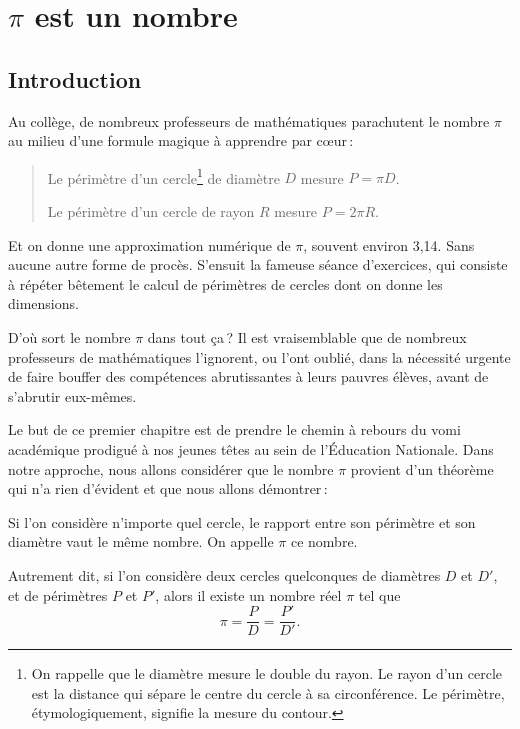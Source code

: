 
\chapter{$\pi$ est un nombre}\label{chap_pinombre}

\section{Introduction}

	Au collège, de nombreux professeurs de mathématiques parachutent le nombre $\pi$ au milieu d'une formule magique à apprendre par c\oe{}ur\,:
	\begin{quote}
		Le périmètre d'un cercle\footnote{On rappelle que le diamètre mesure le double du rayon. Le rayon d'un cercle est la distance qui sépare le centre du cercle à sa circonférence. Le périmètre, étymologiquement, signifie la mesure du contour.} de diamètre $D$ mesure $P=\pi D$.

		Le périmètre d'un cercle de rayon $R$ mesure $P=2\pi R$.
	\end{quote}

	Et on donne une approximation numérique de $\pi$, souvent environ 3,14. Sans aucune autre forme de procès. S'ensuit la fameuse séance d'exercices, qui consiste à répéter bêtement le calcul de périmètres de cercles dont on donne les dimensions.

	D'où sort le nombre $\pi$ dans tout ça\,? Il est vraisemblable que de nombreux professeurs de mathématiques l'ignorent, ou l'ont oublié, dans la nécessité urgente de faire bouffer des compétences abrutissantes à leurs pauvres élèves, avant de s'abrutir eux-mêmes.

	Le but de ce premier chapitre est de prendre le chemin à rebours du vomi académique prodigué à nos jeunes têtes au sein de l'Éducation Nationale. Dans notre approche, nous allons considérer que le nombre $\pi$ provient d'un théorème qui n'a rien d'évident et que nous allons démontrer\,:
	\begin{thm}
		Si l'on considère n'importe quel cercle, le rapport entre son périmètre et son diamètre vaut le même nombre. On appelle $\pi$ ce nombre.

		Autrement dit, si l'on considère deux cercles quelconques de diamètres $D$ et $D'$, et de périmètres $P$ et $P'$, alors il existe un nombre réel $\pi$ tel que
		\begin{equation}
			\pi=\frac{P}{D}=\frac{P'}{D'}. \nonumber
		\end{equation}
	\end{thm}
		
